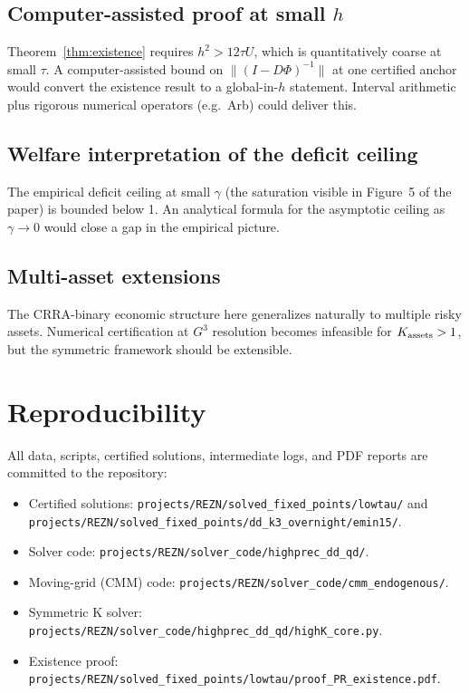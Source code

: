 \documentclass[11pt]{article}
\newcommand{\1}{\mathbf{1}}
\begin{document}
\subsection{Computer-assisted proof at small $h$}

Theorem~\ref{thm:existence} requires $h^2 > 12 \tau U$, which is
quantitatively coarse at small $\tau$.  A computer-assisted bound on
$\|(I - D\Phi)^{-1}\|$ at one certified anchor would convert the
existence result to a global-in-$h$ statement.  Interval arithmetic
plus rigorous numerical operators (e.g.\ Arb) could deliver this.

\subsection{Welfare interpretation of the deficit ceiling}

The empirical deficit ceiling at small $\gamma$ (the saturation visible
in Figure~5 of the paper) is bounded below 1.  An analytical formula
for the asymptotic ceiling as $\gamma \to 0$ would close a gap in the
empirical picture.

\subsection{Multi-asset extensions}

The CRRA-binary economic structure here generalizes naturally to
multiple risky assets.  Numerical certification at $G^3$ resolution
becomes infeasible for $K_{\rm assets} > 1$, but the symmetric
framework should be extensible.

\section{Reproducibility}

All data, scripts, certified solutions, intermediate logs, and PDF
reports are committed to the repository:
\begin{itemize}
\item Certified solutions: \texttt{projects/REZN/solved\_fixed\_points/lowtau/}
and \texttt{projects/REZN/solved\_fixed\_points/dd\_k3\_overnight/emin15/}.
\item Solver code: \texttt{projects/REZN/solver\_code/highprec\_dd\_qd/}.
\item Moving-grid (CMM) code:
\texttt{projects/REZN/solver\_code/cmm\_endogenous/}.
\item Symmetric K solver:
\texttt{projects/REZN/solver\_code/highprec\_dd\_qd/highK\_core.py}.
\item Existence proof: \texttt{projects/REZN/solved\_fixed\_points/lowtau/proof\_PR\_existence.pdf}.
\end{itemize}
\end{document}
